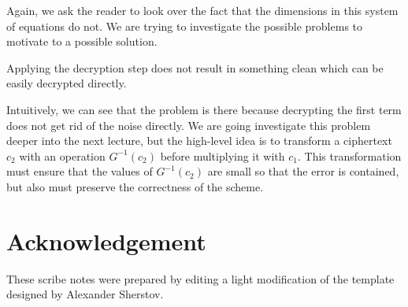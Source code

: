 \documentclass[usletter]{article}
\begin{document}
Again, we ask the reader to look over the fact that the dimensions in this system of equations do not. We are trying to investigate the possible problems to motivate to a possible solution.

\begin{problem}
    Applying the decryption step does not result in something clean which can be easily decrypted directly.
\end{problem}
Intuitively, we can see that the problem is there because decrypting the first term does not get rid of the noise directly. We are going investigate this problem deeper into the next lecture, but the high-level idea is to transform a ciphertext $c_2$ with an operation $G^{-1}(c_2)$ before multiplying it with $c_1$. This transformation must ensure that the values of $G^{-1}(c_2)$ are small so that the error is contained, but also must preserve the correctness of the scheme.

\section*{Acknowledgement}
These scribe notes were prepared by editing a light modification of the template designed by Alexander Sherstov.



\end{document}
